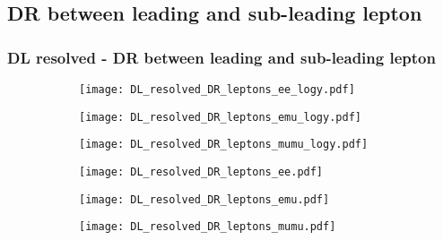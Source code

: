 \documentclass[aspectratio=169,8pt]{beamer}
\begin{document}
\subsection{DR between leading and sub-leading lepton}
\begin{frame}
\frametitle{DL resolved - DR between leading and sub-leading lepton}
\begin{figure}
\captionsetup[subfigure]{labelformat=empty}
\begin{subfigure}{0.32\textwidth}
\texttt{[image: DL\_resolved\_DR\_leptons\_ee\_logy.pdf]}
\vspace*{-0.15cm}
\end{subfigure}
\hfil
\begin{subfigure}{0.32\textwidth}
\texttt{[image: DL\_resolved\_DR\_leptons\_emu\_logy.pdf]}
\vspace*{-0.15cm}
\end{subfigure}
\hfil
\begin{subfigure}{0.32\textwidth}
\texttt{[image: DL\_resolved\_DR\_leptons\_mumu\_logy.pdf]}
\vspace*{-0.15cm}
\end{subfigure}
\hfil
\begin{subfigure}{0.32\textwidth}
\texttt{[image: DL\_resolved\_DR\_leptons\_ee.pdf]}
\vspace*{-0.15cm}
\end{subfigure}
\hfil
\begin{subfigure}{0.32\textwidth}
\texttt{[image: DL\_resolved\_DR\_leptons\_emu.pdf]}
\vspace*{-0.15cm}
\end{subfigure}
\hfil
\begin{subfigure}{0.32\textwidth}
\texttt{[image: DL\_resolved\_DR\_leptons\_mumu.pdf]}
\vspace*{-0.15cm}
\end{subfigure}
\hfil
\end{figure}
\end{frame}
\newpage
\end{document}
